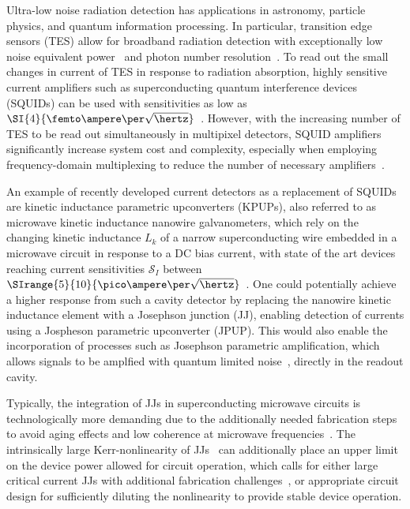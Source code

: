 Ultra-low noise radiation detection has applications in astronomy, particle physics, and quantum information processing.
% 
In particular, transition edge sensors (TES) allow for broadband radiation detection with exceptionally low noise equivalent power~\cite{goldieUltralownoiseMoCuTransition2011} and photon number resolution~\cite{cabreraDetectionSingleInfrared1998,millerDemonstrationLownoiseNearinfrared2003}.
% 
To read out the small changes in current of TES in response to radiation absorption, highly sensitive current amplifiers such as superconducting quantum interference devices (SQUIDs) can be used with sensitivities as low as $\SI{4}{\femto\ampere\per\sqrt{\hertz}}$~\cite{gayUltralowNoiseCurrent2000}.
% 
However, with the increasing number of TES to be read out simultaneously in multipixel detectors, SQUID amplifiers significantly increase system cost and complexity, especially when employing frequency-domain multiplexing to reduce the number of necessary amplifiers~\cite{hendersonReadoutTwokilopixelTransitionedge2016}.

An example of recently developed current detectors as a replacement of SQUIDs are kinetic inductance parametric upconverters (KPUPs), also referred to as microwave kinetic inductance nanowire galvanometers, which rely on the changing kinetic inductance $L_k$ of a narrow superconducting wire embedded in a microwave circuit in response to a DC bias current, with state of the art devices reaching current sensitivities $\mathcal{S}_I$ between $\SIrange{5}{10}{\pico\ampere\per\sqrt{\hertz}}$~\cite{kherKineticInductanceParametric2016,doernerCompactMicrowaveKinetic2018,kuzminTerahertzTransitionEdgeSensor2018}.
%
One could potentially achieve a higher response from such a cavity detector by replacing the nanowire kinetic inductance element with a Josephson junction (JJ), enabling detection of currents using a Jospheson parametric upconverter (JPUP). 
% 
This would also enable the incorporation of processes such as Josephson parametric amplification, which allows signals to be amplfied with quantum limited noise~\cite{stehlikFastChargeSensing2015}, directly in the readout cavity.

Typically, the integration of JJs in superconducting microwave circuits is technologically more demanding due to the additionally needed fabrication steps to avoid aging effects and low coherence at microwave frequencies~\cite{pavolotskyAgingAnnealinginducedVariations2011,gotetiReliabilityStudiesNb2019,gunnarssonDielectricLossesMultilayer2013,yanaiObservationEnhancedCoherence2019}.
% 
The intrinsically large Kerr-nonlinearity of JJs~\cite{wallraffStrongCouplingSingle2004} can additionally place an upper limit on the device power allowed for circuit operation, which calls for either large critical current JJs with additional fabrication challenges~\cite{lecocqJunctionFabricationShadow2011}, or appropriate circuit design for sufficiently diluting the nonlinearity to provide stable device operation.

